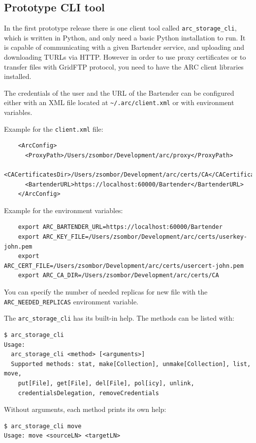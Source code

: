 \documentclass{book}
\begin{document}
\subsection{Prototype CLI tool} %
\label{sub:prototype_cli_tool}

In the first prototype release there is one client tool called \verb!arc_storage_cli!, which is written in Python, and only need a basic Python installation to run. It is capable of communicating with a given Bartender service, and uploading and downloading TURLs via HTTP. However in order to use proxy certificates or to transfer files with GridFTP protocol, you need to have the ARC client libraries installed.

The credentials of the user and the URL of the Bartender can be configured either with an XML file located at \verb!~/.arc/client.xml! or with environment variables.

Example for the \verb!client.xml! file:

\begin{verbatim}
    <ArcConfig>
      <ProxyPath>/Users/zsombor/Development/arc/proxy</ProxyPath>
      <CACertificatesDir>/Users/zsombor/Development/arc/certs/CA</CACertificatesDir>
      <BartenderURL>https://localhost:60000/Bartender</BartenderURL>
    </ArcConfig>
\end{verbatim}

Example for the environment variables:

\begin{verbatim}
    export ARC_BARTENDER_URL=https://localhost:60000/Bartender
    export ARC_KEY_FILE=/Users/zsombor/Development/arc/certs/userkey-john.pem
    export ARC_CERT_FILE=/Users/zsombor/Development/arc/certs/usercert-john.pem 
    export ARC_CA_DIR=/Users/zsombor/Development/arc/certs/CA    
\end{verbatim}

You can specify the number of needed replicas for new file with the \verb!ARC_NEEDED_REPLICAS! environment variable.

The \verb!arc_storage_cli! has its built-in help. The methods can be listed with:

\begin{verbatim}
$ arc_storage_cli
Usage:
  arc_storage_cli <method> [<arguments>]
  Supported methods: stat, make[Collection], unmake[Collection], list, move,
    put[File], get[File], del[File], pol[icy], unlink,
    credentialsDelegation, removeCredentials
\end{verbatim}
Without arguments, each method prints its own help:
\begin{verbatim}
$ arc_storage_cli move
Usage: move <sourceLN> <targetLN>
\end{verbatim}
\end{document}
